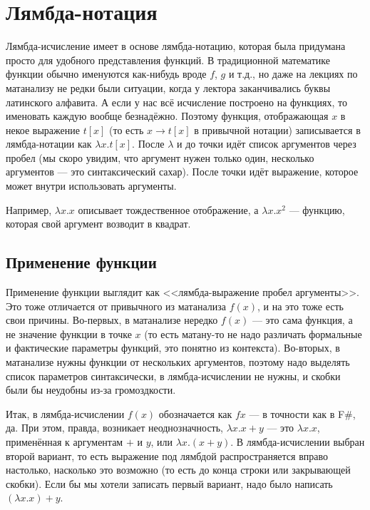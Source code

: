 \documentclass[a5paper]{article}
\begin{document}
\section{Лямбда-нотация}

Лямбда-исчисление имеет в основе лямбда-нотацию, которая была придумана просто для удобного представления функций. В традиционной математике функции обычно именуются как-нибудь вроде $f$, $g$ и т.д., но даже на лекциях по матанализу не редки были ситуации, когда у лектора заканчивались буквы латинского алфавита. А если у нас всё исчисление построено на функциях, то именовать каждую вообще безнадёжно. Поэтому функция, отображающая $x$ в некое выражение $t[x]$ (то есть $x \rightarrow t[x]$ в привычной нотации) записывается в лямбда-нотации как $\lambda x.t[x]$. После $\lambda$ и до точки идёт список аргументов через пробел (мы скоро увидим, что аргумент нужен только один, несколько аргументов --- это синтаксический сахар). После точки идёт выражение, которое может внутри использовать аргументы.

Например, $\lambda x.x$ описывает тождественное отображение, а $\lambda x.x^2$ --- функцию, которая свой аргумент возводит в квадрат.

\subsection{Применение функции}

Применение функции выглядит как <<лямбда-выражение пробел аргументы>>. Это тоже отличается от привычного из матанализа $f(x)$, и на это тоже есть свои причины. Во-первых, в матанализе нередко $f(x)$ --- это сама функция, а не значение функции в точке $x$ (то есть матану-то не надо различать формальные и фактические параметры функций, это понятно из контекста). Во-вторых, в матанализе нужны функции от нескольких аргументов, поэтому надо выделять список параметров синтаксически, в лямбда-исчислении не нужны, и скобки были бы неудобны из-за громоздкости.

Итак, в лямбда-исчислении $f(x)$ обозначается как $f x$ --- в точности как в F\#, да. При этом, правда, возникает неоднозначность, $\lambda x. x + y$ --- это $\lambda x.x$, применённая к аргументам $+$ и $y$, или $\lambda x.(x + y)$. В лямбда-исчислении выбран второй вариант, то есть выражение под лямбдой распространяется вправо настолько, насколько это возможно (то есть до конца строки или закрывающей скобки). Если бы мы хотели записать первый вариант, надо было написать $(\lambda x.x) + y$.
\end{document}
